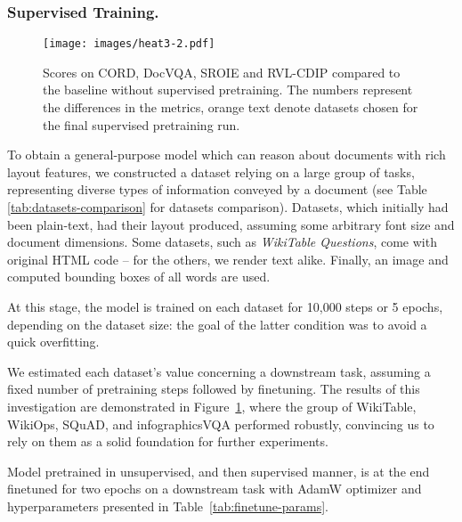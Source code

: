 \documentclass[runningheads]{llncs}
\begin{document}
\subsubsection{Supervised Training.}



\begin{figure}[htp]
\centering
\texttt{[image: images/heat3-2.pdf]}\hfill
\caption{Scores on CORD, DocVQA, SROIE and RVL-CDIP compared to the baseline without supervised pretraining. The numbers represent the differences in the metrics, orange text denote datasets chosen for the final supervised pretraining run.}
\label{fig:pretraining}
\end{figure}

To obtain a general-purpose model which can reason about documents with rich layout features, we constructed a dataset relying on a large group of tasks, representing diverse types of information conveyed by a document (see Table \ref{tab:datasets-comparison} for datasets comparison). Datasets, which initially had been plain-text, had their layout produced, assuming some arbitrary font size and document dimensions. Some datasets, such as \textit{WikiTable Questions}, come with original HTML code -- for the others, we render text alike. Finally, an image and computed bounding boxes of all words are used.

At this stage, the model is trained on each dataset for 10,000 steps or 5 epochs, depending on the dataset size: the goal of the latter condition was to avoid a quick overfitting.



We estimated each dataset's value concerning a downstream task, assuming a fixed number of pretraining steps followed by finetuning. The results of this investigation are demonstrated in Figure~\ref{fig:pretraining}, where the group of WikiTable, WikiOps, SQuAD, and infographicsVQA performed robustly, convincing us to rely on them as a solid foundation for further experiments.

Model pretrained in unsupervised, and then supervised manner, is at the end finetuned for two epochs on a downstream task with AdamW optimizer and hyperparameters presented in Table~\ref{tab:finetune-params}.
\end{document}
